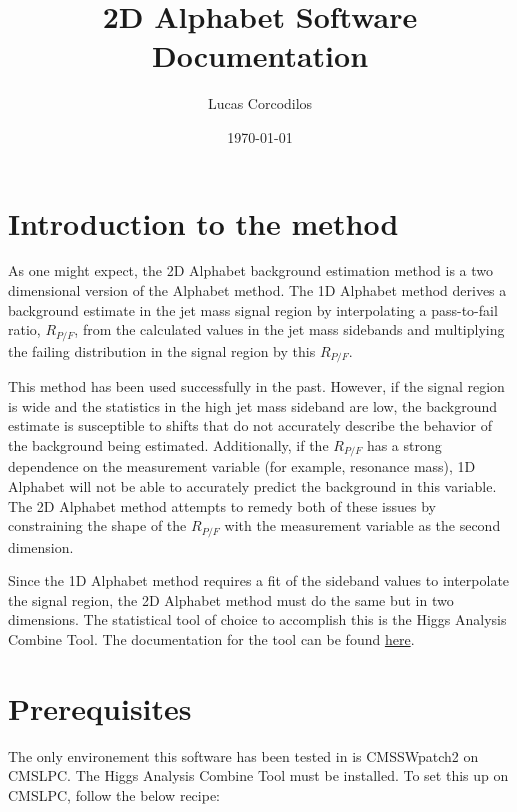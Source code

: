 \documentclass[letter]{article}
\title{2D Alphabet Software Documentation}
\author{Lucas Corcodilos}
\date{\today}
\begin{document}
\maketitle
\titlespacing{\section}{0pt}{5pt}{0pt}
\titlespacing{\subsection}{0pt}{5pt}{0pt}
\titlespacing{\subsubsection}{0pt}{5pt}{0pt}
\setlength{\parskip}{1em}

\section{Introduction to the method}
    As one might expect, the 2D Alphabet background estimation method is a two dimensional version of the Alphabet method. The 1D Alphabet method derives a background estimate in the jet mass signal region by interpolating a pass-to-fail ratio, $R_{P/F}$, from the calculated values in the jet mass sidebands and multiplying the failing distribution in the signal region by this $R_{P/F}$. 

    This method has been used successfully in the past. However, if the signal region is wide and the statistics in the high jet mass sideband are low, the background estimate is susceptible to shifts that do not accurately describe the behavior of the background being estimated. Additionally, if the $R_{P/F}$ has a strong dependence on the measurement variable (for example, resonance mass), 1D Alphabet will not be able to accurately predict the background in this variable. The 2D Alphabet method attempts to remedy both of these issues by constraining the shape of the $R_{P/F}$ with the measurement variable as the second dimension.

    Since the 1D Alphabet method requires a fit of the sideband values to interpolate the signal region, the 2D Alphabet method must do the same but in two dimensions. The statistical tool of choice to accomplish this is the Higgs Analysis Combine Tool. The documentation for the tool can be found \href{https://cms-hcomb.gitbooks.io/combine/content/}{here}. 


\section{Prerequisites}
    The only environement this software has been tested in is CMSSW\textunderscore patch2 on CMSLPC. The Higgs Analysis Combine Tool must be installed. To set this up on CMSLPC, follow the below recipe:
\end{document}
